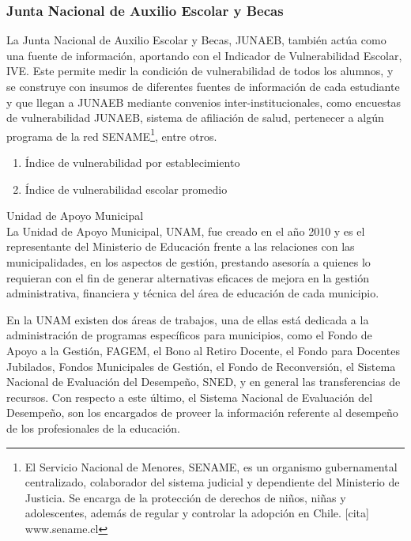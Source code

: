 \subsubsection{Junta Nacional de Auxilio Escolar y Becas}
La Junta Nacional de Auxilio Escolar y Becas, JUNAEB, también actúa como una fuente de información, aportando con el Indicador de Vulnerabilidad Escolar, IVE. Este permite medir la condición de vulnerabilidad de todos los alumnos, y se construye con insumos de diferentes fuentes de información de cada estudiante y que llegan a JUNAEB mediante convenios inter-institucionales, como encuestas de vulnerabilidad JUNAEB, sistema de afiliación de salud, pertenecer a algún programa de la red SENAME\footnote{El Servicio Nacional de Menores, SENAME, es un organismo gubernamental centralizado, colaborador del sistema judicial y dependiente del Ministerio de Justicia. Se encarga de la protección de derechos de niños, niñas y adolescentes, además de regular y controlar la adopción en Chile. [cita] www.sename.cl}, entre otros. 

\begin{enumerate}
\item Índice de vulnerabilidad por establecimiento
\item Índice de vulnerabilidad escolar promedio
\end{enumerate}

\begin{longdescription}
\item [Unidad de Apoyo Municipal] \hfill \\
La Unidad de Apoyo Municipal, UNAM, fue creado en el año 2010 y es el representante del Ministerio de Educación frente a las relaciones con las municipalidades, en los aspectos de gestión, prestando asesoría a quienes lo requieran con el fin de generar alternativas eficaces de mejora en la gestión administrativa, financiera y técnica del área de educación de cada municipio.

En la UNAM existen dos áreas de trabajos, una de ellas está dedicada a la administración de programas específicos para municipios, como el Fondo de Apoyo a la Gestión, FAGEM, el Bono al Retiro Docente, el Fondo para Docentes Jubilados, Fondos Municipales de Gestión, el Fondo de Reconversión, el Sistema Nacional de Evaluación del Desempeño, SNED, y en general las transferencias de recursos.  
Con respecto a este último, el Sistema Nacional de Evaluación del Desempeño, son los encargados de proveer la información referente al desempeño de los profesionales de la educación. 
\end{longdescription}


